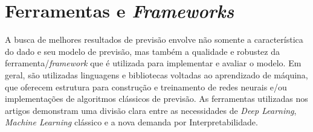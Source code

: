\section{Ferramentas e \textit{Frameworks}}

A busca de melhores resultados de previsão envolve não somente a característica do dado e seu modelo de previsão, mas também a qualidade e robustez da ferramenta/\textit{framework} que é utilizada para implementar e avaliar o modelo. Em geral, são utilizadas linguagens e bibliotecas voltadas ao aprendizado de máquina, que oferecem estrutura para construção e treinamento de redes neurais e/ou implementações de algoritmos clássicos de previsão. As ferramentas utilizadas nos artigos demonstram uma divisão clara entre as necessidades de \textit{Deep Learning}, \textit{Machine Learning} clássico e a nova demanda por Interpretabilidade.

